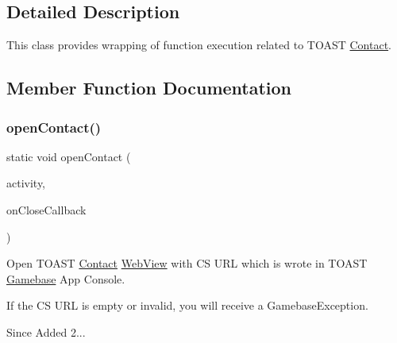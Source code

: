 \subsection{Detailed Description}
This class provides wrapping of function execution related to T\+O\+A\+ST \hyperlink{classcom_1_1toast_1_1android_1_1gamebase_1_1_gamebase_1_1_contact}{Contact}. 

\subsection{Member Function Documentation}
\mbox{\label{classcom_1_1toast_1_1android_1_1gamebase_1_1_gamebase_1_1_contact_a748d63949a52c48845b042e2de9882ac}} 
\subsubsection{\texorpdfstring{open\+Contact()}{openContact()}}
{\footnotesize\ttfamily static void open\+Contact (\begin{DoxyParamCaption}\item[{@Non\+Null final Activity}]{activity,  }\item[{\hyperlink{interfacecom_1_1toast_1_1android_1_1gamebase_1_1_gamebase_callback}{Gamebase\+Callback}}]{on\+Close\+Callback }\end{DoxyParamCaption})\hspace{0.3cm}{\ttfamily [static]}}



Open T\+O\+A\+ST \hyperlink{classcom_1_1toast_1_1android_1_1gamebase_1_1_gamebase_1_1_contact}{Contact} \hyperlink{classcom_1_1toast_1_1android_1_1gamebase_1_1_gamebase_1_1_web_view}{Web\+View} with CS U\+RL which is wrote in T\+O\+A\+ST \hyperlink{classcom_1_1toast_1_1android_1_1gamebase_1_1_gamebase}{Gamebase} App Console. 

If the CS U\+RL is empty or invalid, you will receive a Gamebase\+Exception.

\begin{DoxySince}{Since}
Added 2... 
\end{DoxySince}

